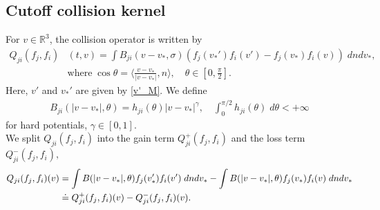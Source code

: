 \documentclass[reqno,10pt]{amsart}
\numberwithin{equation}{section}
\begin{document}
\subsection{Cutoff collision kernel}
For $v \in \mathbb{R}^3$, the collision operator is written by
\begin{align*} 
    Q_{ji}(f_j, f_i) &(t,v) = \int B_{ji}(v-v_*, \sigma)(f_j(v_*')f_i(v')-f_j(v_*)f_i(v)) \; dn dv_*, \\  &\text{where} \; \cos\theta = \langle\frac{v-v_*}{|v-v_*|}, n\rangle, \quad \theta \in [0, \frac{\pi}{2}].
\end{align*} Here, $v'$ and $v_*'$ are given by \eqref{v'_M}. We define 
\begin{align*}
     B_{ji}(|v-v_*|,\theta) = h_{ji}(\theta)|v-v_*|^\gamma ,\quad \int_0^{\pi/2}h_{ji}(\theta) \;d\theta < +\infty
\end{align*} for hard potentials, $\gamma \in [0,1].$\\
We split  $Q_{ji}(f_j,f_i)$ into the gain term $Q_{ji}^{+}(f_j,f_i)$ and the loss term $Q_{ji}^{-}(f_j,f_i),$
\begin{align*} 
    Q_{ji}(f_j,f_i)(v)&=\int B(|v-v_*|,\theta)f_j(v'_*)f_i(v')\; dndv_* - \int B(|v-v_*|,\theta)f_j(v_*)f_i(v)\; dndv_*\\
    &\doteq Q_{ji}^{+}(f_j,f_i)(v)-Q_{ji}^{-}(f_j,f_i)(v). \notag
\end{align*} 
\end{document}
